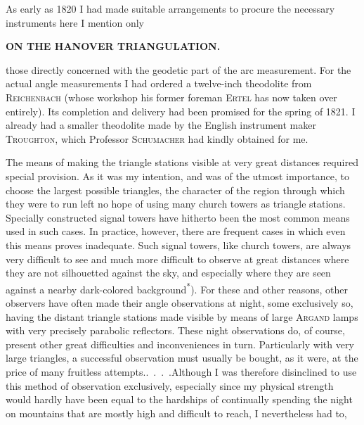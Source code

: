 \par\noindent\hspace*{\parindent}As early as 1820 I had made suitable arrangements to procure the
necessary instruments\textperiodcentered{} here I mention only
\par\clearpage

\noindent\null\hfill{\small\textbf{ON THE HANOVER TRIANGULATION.}}\hfill{}\par\medskip
\noindent those directly concerned with the geodetic part of the arc measurement.
For the actual angle measurements I had ordered a twelve-inch theodolite
from \textsc{Reichenbach} (whose workshop his former foreman \textsc{Ertel} has now
taken over entirely). Its completion and delivery had been promised for the
spring of 1821. I already had a smaller theodolite made by the English instrument
maker \textsc{Troughton}, which Professor \textsc{Schumacher} had kindly obtained for me.

\par\noindent\hspace*{\parindent}The means of making the triangle stations visible at very great distances
required special provision. As it was my intention, and was of the utmost
importance, to choose the largest possible triangles, the character of the
region through which they were to run left no hope of using many church
towers as triangle stations. Specially constructed signal towers have hitherto
been the most common means used in such cases. In practice, however, there
are frequent cases in which even this means proves inadequate. Such signal
towers, like church towers, are always very difficult to see and much more
difficult to observe at great distances where they are not silhouetted against
the sky, and especially where they are seen against a nearby dark-colored
background\textsuperscript{*}). For these and other reasons, other observers have often
made their angle observations at night, some exclusively so, having the distant
triangle stations made visible by means of large \textsc{Argand} lamps with very
precisely parabolic reflectors. These night observations do, of course, present
other great difficulties and inconveniences in turn. Particularly with very
large triangles, a successful observation must usually be bought, as it were,
at the price of many fruitless \mbox{attempts.\enspace\mbox{.\ .\ .\ .}}\quad Although I
was therefore disinclined to use this method of observation exclusively,
especially since my physical strength would hardly have been equal to the
hardships of continually spending the night on mountains that are mostly
high and difficult to reach, I nevertheless had to,

